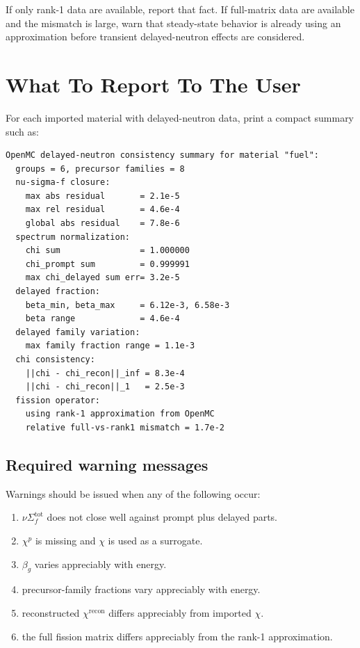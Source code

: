 \documentclass[11pt]{article}
\begin{document}
If only rank-1 data are available, report that fact. If full-matrix data are available and
the mismatch is large, warn that steady-state behavior is already using an approximation
before transient delayed-neutron effects are considered.

\section{What To Report To The User}

For each imported material with delayed-neutron data, print a compact summary such as:

\begin{verbatim}
OpenMC delayed-neutron consistency summary for material "fuel":
  groups = 6, precursor families = 8
  nu-sigma-f closure:
    max abs residual       = 2.1e-5
    max rel residual       = 4.6e-4
    global abs residual    = 7.8e-6
  spectrum normalization:
    chi sum                = 1.000000
    chi_prompt sum         = 0.999991
    max chi_delayed sum err= 3.2e-5
  delayed fraction:
    beta_min, beta_max     = 6.12e-3, 6.58e-3
    beta range             = 4.6e-4
  delayed family variation:
    max family fraction range = 1.1e-3
  chi consistency:
    ||chi - chi_recon||_inf = 8.3e-4
    ||chi - chi_recon||_1   = 2.5e-3
  fission operator:
    using rank-1 approximation from OpenMC
    relative full-vs-rank1 mismatch = 1.7e-2
\end{verbatim}

\subsection{Required warning messages}

Warnings should be issued when any of the following occur:
\begin{enumerate}[label=\arabic*.]
  \item \(\nu \Sigma_f^{\mathrm{tot}}\) does not close well against prompt plus delayed parts.
  \item \(\chi^p\) is missing and \(\chi\) is used as a surrogate.
  \item \(\beta_g\) varies appreciably with energy.
  \item precursor-family fractions vary appreciably with energy.
  \item reconstructed \(\chi^{\mathrm{recon}}\) differs appreciably from imported \(\chi\).
  \item the full fission matrix differs appreciably from the rank-1 approximation.
\end{enumerate}
\end{document}

